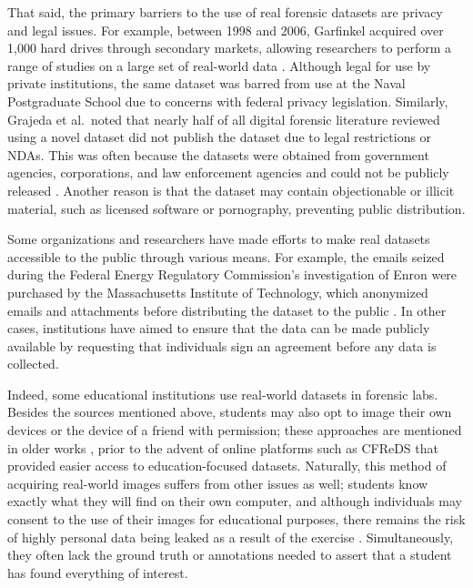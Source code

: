\documentclass[letterpaper,12pt]{report}
\begin{document}
That said, the primary barriers to the use of real forensic datasets are
privacy and legal issues. For example, between 1998 and 2006, Garfinkel
acquired over 1,000 hard drives through secondary markets, allowing
researchers to perform a range of studies on a large set of real-world
data \cite{garfinkelForensicCorporaChallenge2007}. Although legal
for use by private institutions, the same dataset was barred from use at
the Naval Postgraduate School due to concerns with federal privacy
legislation. Similarly, Grajeda et al.~noted that nearly half of all
digital forensic literature reviewed using a novel dataset did not
publish the dataset due to legal restrictions or NDAs. This was often
because the datasets were obtained from government agencies,
corporations, and law enforcement agencies and could not be publicly
released \cite{grajedaAvailabilityDatasetsDigital2017}. Another
reason is that the dataset may contain objectionable or illicit
material, such as licensed software or pornography, preventing public
distribution.

Some organizations and researchers have made efforts to make real
datasets accessible to the public through various means. For example,
the emails seized during the Federal Energy Regulatory Commission's
investigation of Enron were purchased by the Massachusetts Institute of
Technology, which anonymized emails and attachments before distributing
the dataset to the public
\cite{yannikosDataCorporaDigital2014,garfinkelForensicCorporaChallenge2007}.
In other cases, institutions have aimed to ensure that the data can be
made publicly available by requesting that individuals sign an agreement
before any data is collected.

Indeed, some educational institutions use real-world datasets in
forensic labs. Besides the sources mentioned above, students may also
opt to image their own devices or the device of a friend with
permission; these approaches are mentioned in older works
\cite{andersonComparativeStudyTeaching2006,mochForensicImageGenerator2009},
prior to the advent of online platforms such as CFReDS that provided
easier access to education-focused datasets. Naturally, this method of
acquiring real-world images suffers from other issues as well; students
know exactly what they will find on their own computer, and although
individuals may consent to the use of their images for educational
purposes, there remains the risk of highly personal data being leaked as
a result of the exercise \cite{garfinkelBringingScienceDigital2009}.
Simultaneously, they often lack the ground truth or annotations needed
to assert that a student has found everything of interest.
\end{document}
